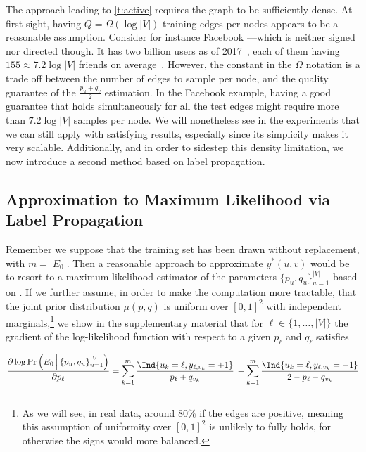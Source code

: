 \medskip

The approach leading to \autoref{t:active} requires the graph to be sufficiently dense. At first sight,
having $Q = \Omega(\log|V|)$ training edges per nodes appears to be a reasonable assumption.
Consider for instance Facebook ---which is neither signed nor directed though. It has two billion
users as of 2017~,
each of them having $155\approx 7.2\log|V|$ friends on average~\autocite{facebookFriend16}. However,
the constant in the $\Omega$ notation is a trade off between the number of edges to sample per
node, and the quality guarantee of the $\frac{p_u+q_v}{2}$ estimation. In the Facebook example,
having a good guarantee that holds simultaneously for all the test edges might require more than
$7.2\log|V|$ samples per node. We will nonetheless see in the experiments that we can still apply
\usrule{} with satisfying results, especially since its simplicity makes it very scalable.
Additionally, and in order to sidestep this density limitation, we now introduce a second method
based on label propagation.

\subsection{Approximation to Maximum Likelihood via Label Propagation}\label{ss:passive}

Remember we suppose that the training set \trainset{} has been drawn \uar{} without replacement, with
$m = |E_0|$. Then a reasonable approach to approximate $y^*(u,v)$ would be to resort to a maximum
likelihood estimator of the parameters $\{p_u, q_u\}_{u=1}^{|V|}$ based on \trainset{}.
If we further assume, in order to make the computation more tractable, that
the joint prior distribution $\mu(p,q)$ is uniform over $[0,1]^2$ with
independent marginals,\footnote{As we will see, in real data, around $80\%$ if the edges are
positive, meaning this assumption of uniformity over $[0,1]^2$ is unlikely to fully holds, for
otherwise the signs would more balanced.}
we show in the supplementary material  that for $\ell \in \{1,
\ldots, |V|\}$ the gradient of the log-likelihood function with respect to a given $p_\ell$ and
$q_\ell$ satisfies

\begin{equation}\label{e:mlp}
\frac{\partial \log \Pr\left(E_0 \,\Big|\, \{p_u, q_u\}_{u=1}^{|V|}\right)}{\partial p_{\ell}}
=
\sum_{k=1}^m
\frac{\Ind{u_k = \ell,y_{\ell,v_k}=+1}}{p_{\ell}+q_{v_k}}\,
- \sum_{k=1}^m
\frac{\Ind{u_k = \ell,y_{\ell,v_k}=-1}}{2-p_{\ell}-q_{v_k}}
\end{equation}

